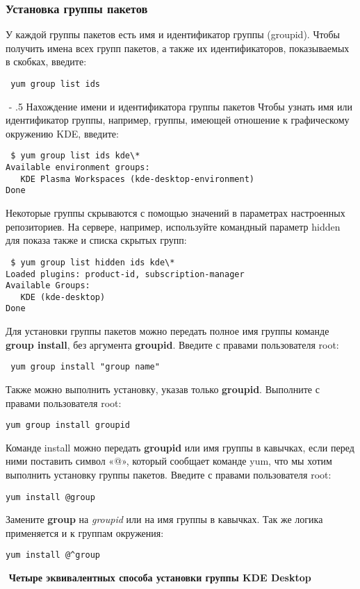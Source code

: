 \documentclass[a4paper,10pt,twoside]{article}
\makeatletter
\renewcommand\paragraph{%
   \@startsection{paragraph}{4}{0mm}%
      {-\baselineskip}%
      {.5\baselineskip}%
      {\normalfont\normalsize\bfseries}}
\makeatother
\begin{document}
\subsubsection{Установка группы пакетов}
У каждой группы пакетов есть имя и идентификатор группы (groupid). Чтобы получить имена всех групп пакетов, а также их идентификаторов, показываемых в скобках, введите:
\begin{verbatim}
 yum group list ids
\end{verbatim}  
⁠
\paragraph{Нахождение имени и идентификатора группы пакетов}
Чтобы узнать имя или идентификатор группы, например, группы, имеющей отношение к графическому окружению KDE, введите:
\begin{verbatim}
 $ yum group list ids kde\*
Available environment groups:
   KDE Plasma Workspaces (kde-desktop-environment)
Done
\end{verbatim} 

Некоторые группы скрываются с помощью значений в параметрах настроенных репозиториев. На сервере, например, используйте командный параметр hidden для показа также и списка скрытых групп:
\begin{verbatim}
 $ yum group list hidden ids kde\*
Loaded plugins: product-id, subscription-manager
Available Groups:
   KDE (kde-desktop)
Done
\end{verbatim} 



Для установки группы пакетов можно передать полное имя группы команде \textbf{group install}, без аргумента \textbf{groupid}. Введите с правами пользователя root: 
\begin{verbatim}
 yum group install "group name"
\end{verbatim} 

Также можно выполнить установку, указав только \textbf{groupid}. Выполните с правами пользователя root: 
\begin{verbatim}
yum group install groupid
\end{verbatim} 

Команде install можно передать \textbf{groupid} или имя группы в кавычках, если перед ними поставить символ «@», который сообщает команде yum, что мы хотим выполнить установку группы пакетов. Введите с правами пользователя root: 
\begin{verbatim}
yum install @group\end{verbatim} 
Замените \textbf{group} на \textit{groupid} или на имя группы в кавычках. Так же логика применяется и к группам окружения:
\begin{verbatim}
yum install @^group
\end{verbatim} 
⁠
\textbf{Четыре эквивалентных способа установки группы KDE Desktop}
\end{document}
